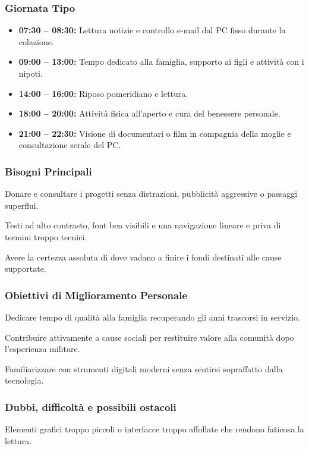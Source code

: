 \documentclass[11pt,a4paper]{article}
\begin{document}
\subsubsection{Giornata Tipo}
\begin{itemize}
    \item \textbf{07:30 -- 08:30:} Lettura notizie e controllo e-mail dal PC fisso durante la colazione.
    \item \textbf{09:00 -- 13:00:} Tempo dedicato alla famiglia, supporto ai figli e attività con i nipoti.
    \item \textbf{14:00 -- 16:00:} Riposo pomeridiano e lettura.
    \item \textbf{18:00 -- 20:00:} Attività fisica all'aperto e cura del benessere personale.
    \item \textbf{21:00 -- 22:30:} Visione di documentari o film in compagnia della moglie e consultazione serale del PC.
\end{itemize}

\subsubsection{Bisogni Principali}

Donare e consultare i progetti senza distrazioni, pubblicità aggressive o passaggi superflui.

Testi ad alto contrasto, font ben visibili e una navigazione lineare e priva di termini troppo tecnici.

Avere la certezza assoluta di dove vadano a finire i fondi destinati alle cause supportate.

\subsubsection{Obiettivi di Miglioramento Personale}

Dedicare tempo di qualità alla famiglia recuperando gli anni trascorsi in servizio.

Contribuire attivamente a cause sociali per restituire valore alla comunità dopo l'esperienza militare.

Familiarizzare con strumenti digitali moderni senza sentirsi sopraffatto dalla tecnologia.

\subsubsection{Dubbi, difficoltà e possibili ostacoli}

Elementi grafici troppo piccoli o interfacce troppo affollate che rendono faticosa la lettura.
\end{document}
